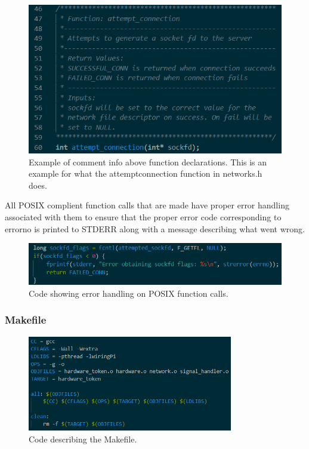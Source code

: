 \documentclass[a4paper,10pt]{article}
\begin{document}
\begin{figure}[H]
  \centering
      \includegraphics[width=\textwidth]{Assets/Comments.png}
  \caption{Example of comment info above function declarations. This is an example for what the attempt\textunderscore connection function in networks.h does.}
\end{figure}

All POSIX complient function calls that are made have proper error handling associated with them to ensure that the proper error code corresponding to errorno is printed to STDERR along with a message describing what went wrong. 

\begin{figure}[H]
  \centering
      \includegraphics[width=\textwidth]{Assets/fcntl.png}
  \caption{Code showing error handling on POSIX function calls.}
\end{figure}

\subsubsection{Makefile}
\begin{figure}[H]
  \centering
      \includegraphics[width=0.8\textwidth]{Assets/Makefile.png}
  \caption{Code describing the Makefile.}
\end{figure}
\end{document}
